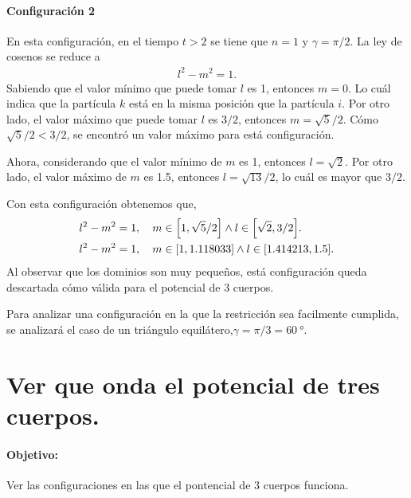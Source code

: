 \documentclass[../main.tex]{subfiles}
\begin{document}
\paragraph{Configuración 2}
En esta configuración, en el tiempo \(t>2\) se tiene que \(n=1\) y \(\gamma=\pi/2\).
La ley de cosenos se reduce a
\begin{align*}
    l^2 - m^2 = 1.
\end{align*}
Sabiendo que el valor mínimo que puede tomar $l$ es \num{1}, entonces \(m=0\).
Lo cuál indica que la partícula $k$ está en la misma posición que la partícula $i$.
Por otro lado, el valor máximo que puede tomar $l$ es \(3/2\), entonces \(m=\sqrt{5}/2\).
Cómo \(\sqrt{5}/2<3/2\), se encontró un valor máximo para está configuración.

Ahora, considerando que el valor mínimo de \(m\) es \num{1}, entonces \(l=\sqrt{2}\).
Por otro lado, el valor máximo de \(m\) es \num{1.5}, entonces \(l=\sqrt{13}/2\), lo cuál es mayor que \(3/2\).

Con esta configuración obtenemos que,
\begin{align*}
    l^2 - m^2 &= 1,\quad m\in\qty[1,\sqrt{5}/2]\wedge l\in\qty[\sqrt{2},3/2]. \\
    l^2 - m^2 &= 1,\quad m\in\qty[1,1.118033]\wedge l\in\qty[1.414213,1.5].
\end{align*}
Al observar que los dominios son muy pequeños, está configuración queda descartada cómo válida para el potencial de 3 cuerpos. 

Para analizar una configuración en la que la restricción sea facilmente cumplida, se analizará el caso de un triángulo equilátero,\(\gamma=\pi/3=\SI{60}{\degree}\).



\newpage

\section{Ver que onda el potencial de tres cuerpos.}

\paragraph{Objetivo:}  Ver las configuraciones en las que el pontencial de 3 cuerpos funciona.
\end{document}
